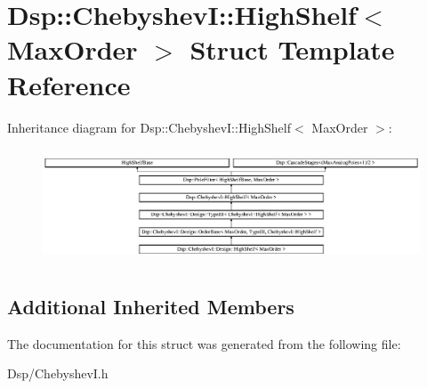 \hypertarget{structDsp_1_1ChebyshevI_1_1HighShelf}{\section{Dsp\-:\-:Chebyshev\-I\-:\-:High\-Shelf$<$ Max\-Order $>$ Struct Template Reference}
\label{structDsp_1_1ChebyshevI_1_1HighShelf}
}
Inheritance diagram for Dsp\-:\-:Chebyshev\-I\-:\-:High\-Shelf$<$ Max\-Order $>$\-:\begin{figure}[H]
\begin{center}
\leavevmode
\includegraphics[height=3.407708cm]{structDsp_1_1ChebyshevI_1_1HighShelf}
\end{center}
\end{figure}
\subsection*{Additional Inherited Members}


The documentation for this struct was generated from the following file\-:\begin{DoxyCompactItemize}
\item 
Dsp/Chebyshev\-I.\-h\end{DoxyCompactItemize}
